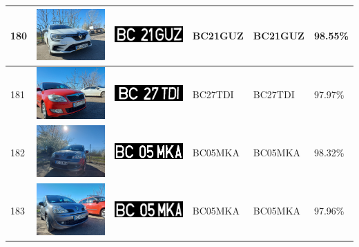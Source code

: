 \documentclass[a4paper,12pt]{report}
\begin{document}
\begin{longtable}{| m{0.6cm} | m{3cm} | m{3cm} | m{1.8cm} | m{1.8cm} | m{1.8cm} |}
    180 & \includegraphics[width=3cm,keepaspectratio]{dataset/111_s1.jpg} & \includegraphics[width=3cm,keepaspectratio]{segmentari/180.jpg} & BC21GUZ             & BC21GUZ              & 98.55\%    \\ \hline
    181 & \includegraphics[width=3cm,keepaspectratio]{dataset/112_s1.jpg} & \includegraphics[width=3cm,keepaspectratio]{segmentari/181.jpg} & BC27TDI             & BC27TDI              & 97.97\%    \\ \hline
    182 & \includegraphics[width=3cm,keepaspectratio]{dataset/113_d1.jpg} & \includegraphics[width=3cm,keepaspectratio]{segmentari/182.jpg} & BC05MKA             & BC05MKA              & 98.32\%    \\ \hline
    183 & \includegraphics[width=3cm,keepaspectratio]{dataset/113_s1.jpg} & \includegraphics[width=3cm,keepaspectratio]{segmentari/183.jpg} & BC05MKA             & BC05MKA              & 97.96\%    \\ \hline

\end{longtable}
\end{document}
